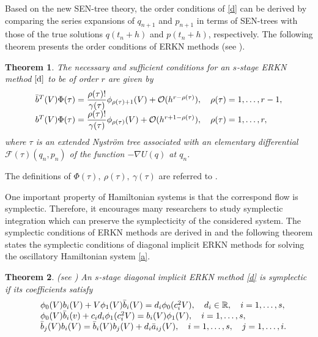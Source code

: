 \documentclass{article}
\newtheorem{theo}{Theorem}
\begin{document}
Based on the new SEN-tree theory, the order conditions of \eqref{d}
can be derived by comparing the series expansions of $q_{n+1}$ and
$p_{n+1}$ in terms of SEN-trees with those of the true solutions
$q(t_{n}+h)$ and $p(t_{n}+h)$, respectively. The following theorem
presents the order conditions of  ERKN methods (see \cite{Wu2010}).
\begin{theo}
\label{abc} The necessary and sufficient conditions for an $s$-stage
 ERKN method $\eqref{d}$ to be
of order $r$ are given by
\begin{equation}\label{f}
\begin{array}
[c]{l}%
\bar{b}^{T}(V)\Phi(\tau)=\dfrac{\rho(\tau)!}{\gamma(\tau)}\phi_{\rho(\tau
)+1}(V)+\mathcal{O}(h^{r-\rho(\tau)}),\ \ \ \rho(\tau)=1,\ldots,r-1,\\
b^{T}(V)\Phi(\tau)=\dfrac{\rho(\tau)!}{\gamma(\tau)}\phi_{\rho(\tau
)}(V)+\mathcal{O}(h^{r+1-\rho(\tau)}),\ \ \ \rho(\tau)=1,\ldots,r,
\end{array}
\end{equation}
where $\tau$ is an extended Nystr\"{o}m tree associated with an
elementary differential $\mathcal{F}(\tau)(q_{n},p_{n})$ of the
function $-\nabla U(q)$ at $q_{n}$.
\end{theo}

The definitions of $\Phi(\tau),\ \rho(\tau),\ \gamma(\tau)$ are
referred to \cite{Wu2010}.



One important property of Hamiltonian systems is that the correspond
flow is symplectic. Therefore, it encourages many researchers to
study symplectic integration which can preserve the symplecticity of
the considered system. The symplectic conditions of ERKN methods are
derived in \cite{wu2013-ANM} and the following theorem states the
symplectic conditions of diagonal implicit ERKN methods for solving
the oscillatory Hamiltonian system \eqref{a}.
\begin{theo}
\label{asdfg} (see \cite{wu-2012-BIT}) An $s$-stage diagonal
implicit ERKN method \eqref{d} is symplectic if its coefficients
satisfy
\begin{equation}
\begin{array}
[c]{ll}
&\phi_{0}(V)b_{i}(V)+V\phi_{1}(V)\bar{b}_{i}(V)=d_{i}\phi_{0}(c_{i}^{2}V),\ \ \ d_{i}\in\mathbb{R},\ \ \ i=1,\ldots,s, \\

&\phi_{0}(V)\bar{b}_{i}(v)+c_{i}d_{i}\phi_{1}(c_{i}^{2}V)=b_{i}(V)\phi_{1}(V),\ \ \ i=1,\ldots,s, \\

&\bar{b}_{j}(V)b_{i}(V)=\bar{b}_{i}(V)b_{j}(V)+d_{i}\bar{a}_{ij}(V),
\ \ \ i=1,\ldots,s,\ \ \ j=1,\ldots,i.
\end{array}
\label{g}%
\end{equation}
\end{theo}
\end{document}
